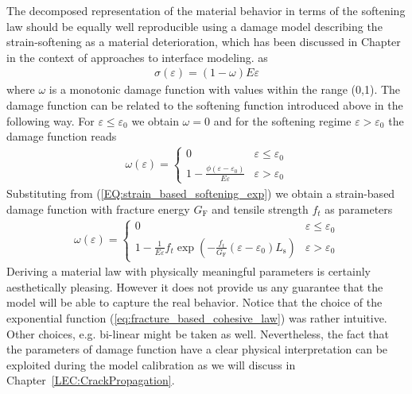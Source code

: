 \documentclass[main.tex]{subfiles}
\begin{document}
The decomposed representation of the material behavior in terms of the softening law should be equally well reproducible using a damage model describing the strain-softening as a material deterioration, which has been discussed in Chapter %
in the context of approaches to interface modeling. as
\begin{align}
\sigma(\varepsilon) = (1 - \omega) E \varepsilon
\end{align}
where $\omega$ is a monotonic damage function with values within the range (0,1). 
The damage function can be related to the softening function introduced above in the following way. For $\varepsilon \le \varepsilon_0$ we obtain $\omega = 0$ and for the softening regime $\varepsilon > \varepsilon_0 $ the damage function reads
\begin{align}
\omega(\varepsilon) = \left\{ 
\begin{array}{ll}
0  &   \varepsilon \le \varepsilon_0 \\
1 - \displaystyle{\frac{ \phi(\varepsilon - \varepsilon_0) }{E \varepsilon }}
 &   \varepsilon > \varepsilon_0
\end{array}
\right.
\end{align}
Substituting from (\ref{EQ:strain_based_softening_exp}) we obtain a strain-based damage function with fracture energy $G_\mathrm{F}$ and tensile strength $f_t$ as parameters 
\begin{align}
\label{eq:damge_fn_fracture_base_exp}
\omega(\varepsilon) = \left\{ 
\begin{array}{ll}
0  &   \varepsilon \le \varepsilon_0 \\
1 - \displaystyle{\frac{ 1 }{E \varepsilon }}
f_t \exp\left( - \frac{f_t}{G_\mathrm{F}} \left(\varepsilon - \varepsilon_0\right) L_\mathrm{s} \right)
 &   \varepsilon > \varepsilon_0
\end{array}
\right.
\end{align}
Deriving a material law with physically meaningful parameters is certainly aesthetically pleasing. However it does not provide us any guarantee that the model will be able to capture the real behavior. Notice that the choice of the exponential function (\ref{eq:fracture_based_cohesive_law}) was rather intuitive. Other choices, e.g. bi-linear might be taken as well.
Nevertheless, the fact that the parameters of damage function have a clear physical interpretation can be exploited during the model calibration as we will discuss in Chapter~\ref{LEC:CrackPropagation}. 
\end{document}

